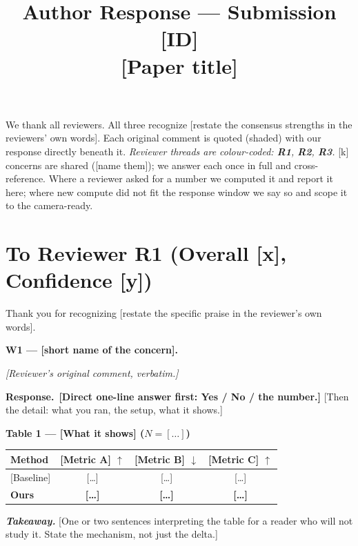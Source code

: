 \documentclass[11pt]{article}
\title{\vspace{-2em}Author Response --- Submission [ID]\\
\large [Paper title]}
\date{}
\newcommand{\rA}{\textcolor{cRA}{\textbf{R1}}}
\newcommand{\rB}{\textcolor{cRB}{\textbf{R2}}}
\newcommand{\rC}{\textcolor{cRC}{\textbf{R3}}}
\newcommand{\Rq}[1]{\begin{rquotebox}\small\itshape #1\end{rquotebox}}
\newcommand{\Resp}{\textbf{Response.}\ }
\newcommand{\point}[1]{\smallskip\noindent\textbf{#1}\ }
\begin{document}
\maketitle
\vspace{-3em}

We thank all reviewers. All three recognize [restate the consensus strengths
in the reviewers' own words]. Each original comment is quoted (shaded) with
our response directly beneath it. \emph{Reviewer threads are colour-coded:
\rA{}, \rB{}, \rC{}.} [k] concerns are shared ([name them]); we answer each
once in full and cross-reference. Where a reviewer asked for a number we
computed it and report it here; where new compute did not fit the response
window we say so and scope it to the camera-ready.

\section{To Reviewer \rA{} \normalfont(Overall [x], Confidence [y])}
Thank you for recognizing [restate the specific praise in the reviewer's own
words]. %

\point{W1 --- [short name of the concern].}
\Rq{[Reviewer's original comment, verbatim.]}
\Resp \textbf{[Direct one-line answer first: Yes / No / the number.]} [Then
the detail: what you ran, the setup, what it shows.] %

\begin{center}\scriptsize
\textbf{Table 1 --- [What it shows] ($N{=}[\ldots]$)}\\[2pt]
\begin{tabular}{@{}lccc@{}}
\toprule
Method & [Metric A] $\uparrow$ & [Metric B] $\downarrow$ & [Metric C] $\uparrow$ \\
\midrule
{[Baseline]}  & [\ldots] & [\ldots] & [\ldots] \\
\textbf{Ours} & \textbf{[\ldots]} & \textbf{[\ldots]} & \textbf{[\ldots]} \\
\bottomrule
\end{tabular}
\end{center}
\noindent\textbf{\emph{Takeaway.}} [One or two sentences interpreting the
table for a reader who will not study it. State the mechanism, not just the
delta.]
\end{document}
